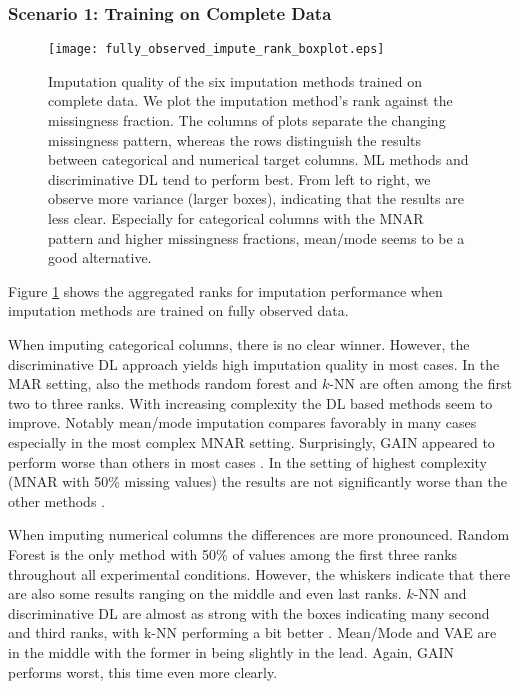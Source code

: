 \subsubsection{Scenario 1: Training on Complete Data}

\begin{figure}\centering
    \texttt{[image: fully\_observed\_impute\_rank\_boxplot.eps]}
    \caption[Imputation Ranks - Fully Observed]{Imputation quality of the six imputation methods trained on complete data. We plot the imputation method's rank against the missingness fraction. The columns of plots separate the changing missingness pattern, whereas the rows distinguish the results between categorical and numerical target columns. ML methods and discriminative DL tend to perform best. From left to right, we observe more variance (larger boxes), indicating that the results are less clear. Especially for categorical columns with the MNAR pattern and higher missingness fractions, mean/mode seems to be a good alternative.
	}
	\label{fig:fully_observed_impute_rank_boxplot}
\end{figure}

Figure \ref{fig:fully_observed_impute_rank_boxplot} shows the aggregated ranks for imputation performance when imputation methods are trained on fully observed data.

When imputing categorical columns, there is no clear winner. However, the discriminative DL approach yields high imputation quality in most cases. In the MAR setting, also the methods random forest and $k$-NN are often among the first two to three ranks. With increasing complexity the DL based methods seem to improve. Notably mean/mode imputation compares favorably in many cases especially in the most complex MNAR setting. Surprisingly, GAIN appeared to perform worse than others in most cases . In the setting of highest complexity (MNAR with 50\% missing values) the results are not significantly worse than the other methods .

When imputing numerical columns the differences are more pronounced. Random Forest is the only method with 50\% of values among the first three ranks throughout all experimental conditions. However, the whiskers indicate that there are also some results ranging on the middle and even last ranks. $k$-NN and discriminative DL are almost as strong with the boxes indicating many second and third ranks, with k-NN performing a bit better . Mean/Mode and VAE are in the middle with the former in being slightly in the lead.  Again, GAIN performs worst, this time even more clearly.

